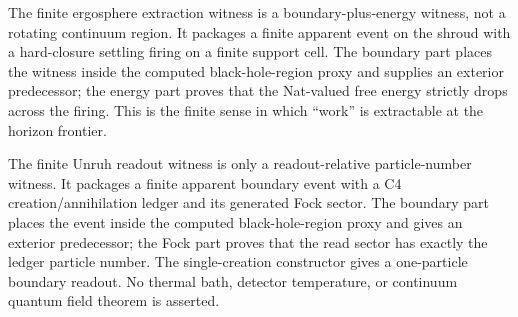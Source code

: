 \begin{theorem}\label{thm:finite-ergosphere-extraction}\leanok{}
The finite ergosphere extraction witness is a boundary-plus-energy witness, not
a rotating continuum region.  It packages a finite apparent event on the shroud
with a hard-closure settling firing on a finite support cell.  The boundary part
places the witness inside the computed black-hole-region proxy and supplies an
exterior predecessor; the energy part proves that the Nat-valued free
energy strictly drops across the firing.  This is the finite sense in which
``work'' is extractable at the horizon frontier.
\end{theorem}

\begin{theorem}\label{thm:finite-unruh-readout-witness}\leanok{}
The finite Unruh readout witness is only a readout-relative particle-number
witness.  It packages a finite apparent boundary event with a C4
creation/annihilation ledger and its generated Fock sector.  The boundary part
places the event inside the computed black-hole-region proxy and gives an
exterior predecessor; the Fock part proves that the read sector has exactly the
ledger particle number.  The single-creation constructor gives a one-particle
boundary readout.  No thermal bath, detector temperature, or continuum quantum
field theorem is asserted.
\end{theorem}


